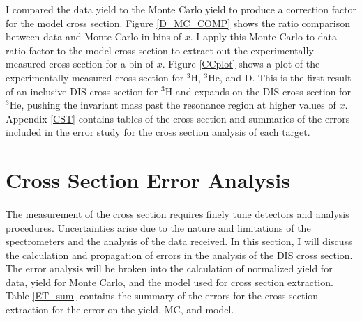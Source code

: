 \iffalse
\begin{landscape}
\begin{figure}
	\hspace{-40pt}
	\texttt{[image: ../images/total\_xs\_L.pdf]}
	\caption{Experimentally measured cross section using the Monte Carlo ratio method for $^3$H, $^3$He, and D. Normalization uncertainty due to target thickness uncertainty for $^3$H= 0.97\%, $^3$He = 1.12\%, and D = 0.56\%.}
\end{figure}
\end{landscape}
\fi


I compared the data yield to the Monte Carlo yield to produce a correction factor for the model cross section. Figure \ref{D_MC_COMP} shows the ratio comparison between data and Monte Carlo in bins of $x$. I apply this Monte Carlo to data ratio factor to the model cross section to extract out the experimentally measured cross section for a bin of $x$. Figure \ref{CCplot} shows a plot of the experimentally measured cross section for $^3$H, $^3$He, and D.  This is the first result of an inclusive DIS cross section for $^3$H and expands on the DIS cross section for $^3$He, pushing the invariant mass past the resonance region at higher values of $x$.  Appendix \ref{CST} contains tables of the cross section and summaries of the errors included in the error study for the cross section analysis of each target. 
\section{Cross Section Error Analysis}
\paragraph{}The measurement of the cross section requires finely tune detectors and analysis procedures. Uncertainties arise due to the nature and limitations of the spectrometers and the analysis of the data received. In this section, I will discuss the calculation and propagation of errors in the analysis of the DIS cross section. The error analysis will be broken into the calculation of normalized yield for data, yield for Monte Carlo, and the model used for cross section extraction. Table \ref{ET_sum} contains the summary of the errors for the cross section extraction for the error on the yield, MC, and model. 

